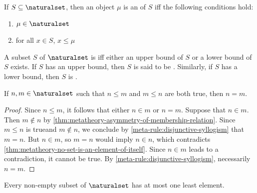 \begin{dfn}
     \label{dfn:metatheory-upper-bound-of-a-subset-of-N}
    If \( S \subseteq \naturalset \), then an object \( \mu \) is an  of \( S \)
    iff the following conditions hold:
    \begin{enumerate}[topsep=2pt,label=\textup{\texttt{(\alph*)}}]
        \item \( \mu \in \naturalset \)
        \item for all \( x \in S \), \( x \leq \mu \)
    \end{enumerate}
\end{dfn}

\begin{dfn}[Boundedness]
     \label{dfn:metatheory-boundedness-of-a-subset-of-N}
    A subset \( S \) of \( \naturalset \) is  iff either an upper bound of \( S \) or a lower bound of \( S \) exists.
    If \( S \) has an upper bound, then \( S \) is said to be .
    Similarly, if \( S \) has a lower bound, then \( S \) is .
\end{dfn}

\begin{thm}
     \label{thm:metatheory-antisymmetric-property-of-membership-relation-of-N}
    If \( n, m \in \naturalset \) such that \( n \leq m \) and \( m \leq n \) are both true,
    then \( n = m \).
\end{thm}

\begin{proof}
    Since \( n \leq m \), it follows that either \( n \in m \) or \( n = m \).
    Suppose that \( n \in m \).
    Then \( m \notin n \) by \cref{thm:metatheory-asymmetry-of-membership-relation}.
    Since \( m \leq n \) is trueand \( m \notin n \), we conclude by \cref{meta-rule:disjunctive-syllogism} that \( m = n \).
    But \( n \in m \), so \( m = n \) would imply \( n \in n \), which contradicts \cref{thm:metatheory-no-set-is-an-element-of-itself}.
    Since \( n \in m \) leads to a contradiction, it cannot be true.
    By \cref{meta-rule:disjunctive-syllogism}, necessarily \( n = m \).
\end{proof}

\begin{thm}
     \label{thm:metatheory-uniqueness-of-least-element-of-a-non-empty-subset-of-N}
    Every non-empty subset of \( \naturalset \) has at most one least element.
\end{thm}

